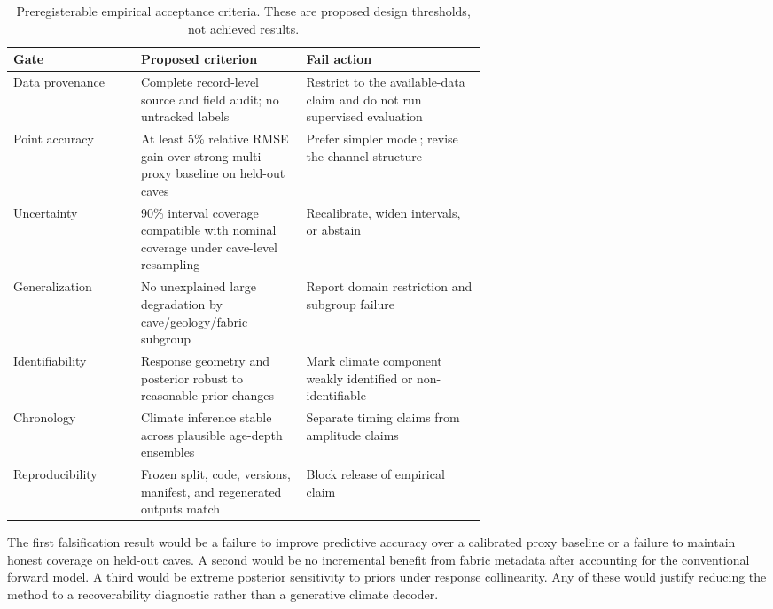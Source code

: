\documentclass[11pt,a4paper]{article}
\begin{document}
\begin{table}[!htbp]\centering\small
\caption{Preregisterable empirical acceptance criteria. These are proposed design thresholds, not achieved results.}\label{tab:accept}
\begin{tabularx}{\linewidth}{p{0.27\linewidth}p{0.35\linewidth}X}\toprule
Gate & Proposed criterion & Fail action \\\midrule
Data provenance & Complete record-level source and field audit; no untracked labels & Restrict to the available-data claim and do not run supervised evaluation \\
Point accuracy & At least 5\% relative RMSE gain over strong multi-proxy baseline on held-out caves & Prefer simpler model; revise the channel structure \\
Uncertainty & 90\% interval coverage compatible with nominal coverage under cave-level resampling & Recalibrate, widen intervals, or abstain \\
Generalization & No unexplained large degradation by cave/geology/fabric subgroup & Report domain restriction and subgroup failure \\
Identifiability & Response geometry and posterior robust to reasonable prior changes & Mark climate component weakly identified or non-identifiable \\
Chronology & Climate inference stable across plausible age-depth ensembles & Separate timing claims from amplitude claims \\
Reproducibility & Frozen split, code, versions, manifest, and regenerated outputs match & Block release of empirical claim \\
\bottomrule\end{tabularx}\end{table}

The first falsification result would be a failure to improve predictive accuracy over a calibrated proxy baseline or a failure to maintain honest coverage on held-out caves. A second would be no incremental benefit from fabric metadata after accounting for the conventional forward model. A third would be extreme posterior sensitivity to priors under response collinearity. Any of these would justify reducing the method to a recoverability diagnostic rather than a generative climate decoder.
\end{document}
